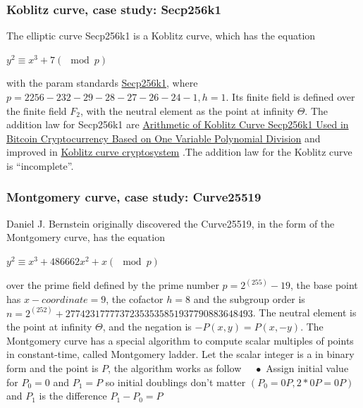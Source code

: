 \subsubsection{Koblitz curve, case study: Secp256k1}
The elliptic curve Secp256k1 is a Koblitz curve, which has the equation\\
\hspace{0.5cm}
\begin{center}
$y^2 \equiv x^3 + 7(\mod p)$\\
\end{center}
\hspace{0.5cm}
with the param standards \href{https://en.bitcoin.it/wiki/Secp256k1}{Secp256k1}, where $p = 2256 - 232 - 29 - 28 - 27 - 26 - 24 - 1, h = 1$. Its finite field is defined over the finite field $F_2$, with the neutral element as the point at infinity $\Theta$. The addition law for Secp256k1 are \href{https://www.researchgate.net/publication/332783847_Arithmetic_of_Koblitz_Curve_Secp256k1_Used_in_Bitcoin_Cryptocurrency_Based_on_One_Variable_Polynomial_Division} {Arithmetic of Koblitz Curve Secp256k1 Used in Bitcoin Cryptocurrency Based on One Variable Polynomial Division} and improved in \href{https://www.researchgate.net/publication/223346975_Koblitz_curve_cryptosystems}{Koblitz curve cryptosystem} .The addition law for the Koblitz curve is “incomplete”.\\


\subsubsection{Montgomery curve, case study: Curve25519}
Daniel J. Bernstein originally discovered the Curve25519, in the form of the Montgomery curve, has the equation\\
\hspace{0.5cm}
\begin{center}
$y^2 \equiv x^3 + 486662x^2 + x(\mod p) $\\
\end{center}
\hspace{0.5cm}
over the prime field defined by the prime number $p=2^(255)-19$, the base point has $x-coordinate = 9$,  the cofactor $h= 8$ and the subgroup order is $n = 2^(252) + 27742317777372353535851937790883648493$. The neutral element is the point at infinity $\Theta$, and the negation is $-P(x, y) = P(x, -y)$. The Montgomery curve has a special algorithm to compute scalar multiples of points in constant-time, called Montgomery ladder. Let the scalar integer is a in binary form and the point is $P$, the algorithm works as follow 
$\quad\bullet$ Assign initial value for $P_0 = 0$ and $P_1 = P$ so initial doublings don’t matter $(P_0 =0P, 2*0P = 0P)$ and $P_1$ is the difference $P_1 - P_0 = P$\\

